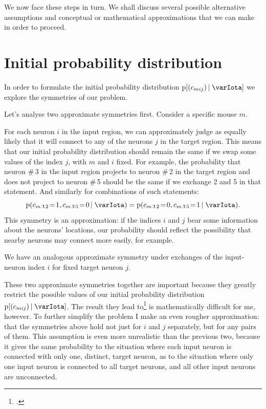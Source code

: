 \documentclass[\ifafour a4paper,12pt,\else a5paper,10pt,\fi%
onecolumn,oneside,article,%
british%
]{memoir}
\theoremstyle{remark}
\theoremstyle{innote}
\newcommand*{\citep}{\footcites}
\newcommand*{\pf}{\mathrm{p}}%
\renewcommand*{\|}[1][]{\nonscript\,#1\vert\nonscript\;\mathopen{}}
\newcommand*{\yI}{\varIota}
\newcommand*{\yc}{c}
\newcommand*{\eq}{\mathrel{\!=\!}}
\begin{document}
We now face these steps in turn. We shall discuss several possible
alternative assumptions and conceptual or mathematical approximations that
we can make in order to proceed.

\section{Initial probability distribution}
\label{sec:init_prob}

In order to formulate the initial probability distribution $\pf[(\yc_{mij})
\| \yI]$ we explore the symmetries of our problem.

Let's analyse two approximate symmetries first. Consider a specific mouse
$m$.

For each neuron $i$ in the input region, we can approximately judge as
equally likely that it will connect to any of the neurons $j$ in the target
region. This means that our initial probability distribution should remain
the same if we swap some values of the index $j$, with $m$ and $i$ fixed.
For example, the probability that neuron \#\,3 in the input region projects
to neuron \#\,2 in the target region and does not project to neuron \#\,5
should be the same if we exchange 2 and 5 in that statement. And similarly
for combinations of such statements:
\begin{equation}
  \label{eq:example_exch_j}
  \pf(\yc_{m\,3\,2} \eq 1, \yc_{m\,3\,5} \eq 0 \| \yI )
=  \pf(\yc_{m\,3\,2} \eq 0, \yc_{m\,3\,5} \eq 1 \| \yI ).
\end{equation}
This symmetry is an approximation: if the indices $i$ and $j$ bear some
information about the neurons' locations, our probability should reflect
the possibility that nearby neurons may connect more easily, for example.

We have an analogous approximate symmetry under exchanges of the
input-neuron index $i$ for fixed target neuron $j$.

These two approximate symmetries together are important because they
greatly restrict the possible values of our initial probability
distribution $\pf[(\yc_{mij}) \| \yI]$. The result they lead
to\citep{hoover1979,aldous1981,diaconisetal1981b} is mathematically
difficult for me, however. To further simplify the problem I make an even
rougher approximation: that the symmetries above hold not just for $i$ and
$j$ separately, but for any pairs of them. This assumption is even more
unrealistic than the previous two, because it gives the same probability to
the situation where each input neuron is connected with only one, distinct,
target neuron, as to the situation where only one input neuron is connected
to all target neurons, and all other input neurons are unconnected.
\end{document}
